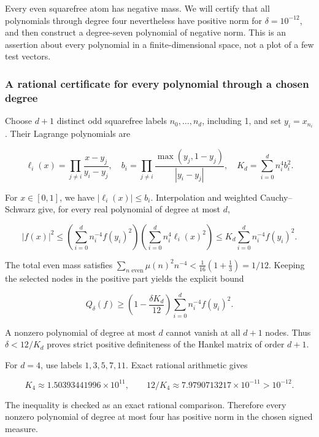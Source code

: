 Every even squarefree atom has negative mass. We will certify that all
polynomials through degree four nevertheless have positive norm for
\(\delta=10^{-12}\), and then construct a degree-seven polynomial of
negative norm. This is an assertion about every polynomial in a
finite-dimensional space, not a plot of a few test vectors.

\hypertarget{v11-resolution_full-a-rational-certificate-for-every-polynomial-through-a-chosen-degree}{%
\subsubsection{A rational certificate for every polynomial through a
chosen
degree}\label{v11-resolution_full-a-rational-certificate-for-every-polynomial-through-a-chosen-degree}}

Choose \(d+1\) distinct odd squarefree labels \(n_0,\ldots,n_d\),
including 1, and set \(y_i=x_{n_i}\). Their Lagrange polynomials are

\[
\ell_i(x)=\prod_{j\ne i}\frac{x-y_j}{y_i-y_j},
\quad
b_i=\prod_{j\ne i}\frac{\max(y_j,1-y_j)}{|y_i-y_j|},
\quad K_d=\sum_{i=0}^{d}n_i^4b_i^2.
\]

For \(x\in[0,1]\), we have \(|\ell_i(x)|\le b_i\). Interpolation and
weighted Cauchy--Schwarz give, for every real polynomial of degree at
most \(d\),

\[
|f(x)|^2\le
\left(\sum_{i=0}^{d}n_i^{-4}f(y_i)^2\right)
\left(\sum_{i=0}^{d}n_i^4\ell_i(x)^2\right)
\le K_d\sum_{i=0}^{d}n_i^{-4}f(y_i)^2.
\]

The total even mass satisfies
\(\sum_{n\text{ even}}\mu(n)^2n^{-4}<\frac1{16}(1+\frac13)=1/12\).
Keeping the selected nodes in the positive part yields the explicit
bound

\[
\boxed{Q_\delta(f)\ge
\left(1-\frac{\delta K_d}{12}\right)
\sum_{i=0}^{d}n_i^{-4}f(y_i)^2.}
\tag{RA-9}
\]

A nonzero polynomial of degree at most \(d\) cannot vanish at all
\(d+1\) nodes. Thus \(\delta<12/K_d\) proves strict positive
definiteness of the Hankel matrix of order \(d+1\).

For \(d=4\), use labels \(1,3,5,7,11\). Exact rational arithmetic gives

\[
K_4\approx1.50393441996\times10^{11},\qquad
12/K_4\approx7.9790713217\times10^{-11}>10^{-12}.
\]

The inequality is checked as an exact rational comparison. Therefore
every nonzero polynomial of degree at most four has positive norm in the
chosen signed measure.

